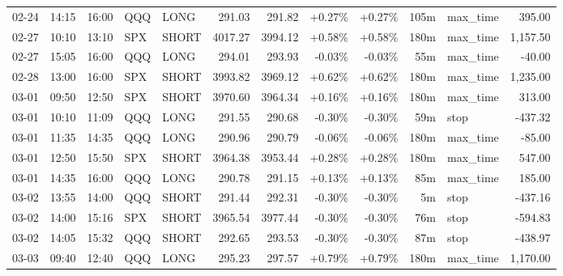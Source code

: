 \documentclass[11pt,a4paper,twoside]{article}
\begin{document}
\begin{center}
\begin{longtable}{>{\color{txtmain}}l l l l l r r r r r >{\color{txtmain}}l r}
02-24 & 14:15 & 16:00 & QQQ & LONG & 291.03 & 291.82 & \textcolor{wingreen}{+0.27\%} & \textcolor{wingreen}{+0.27\%} & 105m & max\_time & \textcolor{wingreen}{395.00} \\
02-27 & 10:10 & 13:10 & SPX & SHORT & 4017.27 & 3994.12 & \textcolor{wingreen}{+0.58\%} & \textcolor{wingreen}{+0.58\%} & 180m & max\_time & \textcolor{wingreen}{1,157.50} \\
02-27 & 15:05 & 16:00 & QQQ & LONG & 294.01 & 293.93 & \textcolor{lossred}{-0.03\%} & \textcolor{lossred}{-0.03\%} & 55m & max\_time & \textcolor{lossred}{-40.00} \\
02-28 & 13:00 & 16:00 & SPX & SHORT & 3993.82 & 3969.12 & \textcolor{wingreen}{+0.62\%} & \textcolor{wingreen}{+0.62\%} & 180m & max\_time & \textcolor{wingreen}{1,235.00} \\
03-01 & 09:50 & 12:50 & SPX & SHORT & 3970.60 & 3964.34 & \textcolor{wingreen}{+0.16\%} & \textcolor{wingreen}{+0.16\%} & 180m & max\_time & \textcolor{wingreen}{313.00} \\
03-01 & 10:10 & 11:09 & QQQ & LONG & 291.55 & 290.68 & \textcolor{lossred}{-0.30\%} & \textcolor{lossred}{-0.30\%} & 59m & stop & \textcolor{lossred}{-437.32} \\
03-01 & 11:35 & 14:35 & QQQ & LONG & 290.96 & 290.79 & \textcolor{lossred}{-0.06\%} & \textcolor{lossred}{-0.06\%} & 180m & max\_time & \textcolor{lossred}{-85.00} \\
03-01 & 12:50 & 15:50 & SPX & SHORT & 3964.38 & 3953.44 & \textcolor{wingreen}{+0.28\%} & \textcolor{wingreen}{+0.28\%} & 180m & max\_time & \textcolor{wingreen}{547.00} \\
03-01 & 14:35 & 16:00 & QQQ & LONG & 290.78 & 291.15 & \textcolor{wingreen}{+0.13\%} & \textcolor{wingreen}{+0.13\%} & 85m & max\_time & \textcolor{wingreen}{185.00} \\
03-02 & 13:55 & 14:00 & QQQ & SHORT & 291.44 & 292.31 & \textcolor{lossred}{-0.30\%} & \textcolor{lossred}{-0.30\%} & 5m & stop & \textcolor{lossred}{-437.16} \\
03-02 & 14:00 & 15:16 & SPX & SHORT & 3965.54 & 3977.44 & \textcolor{lossred}{-0.30\%} & \textcolor{lossred}{-0.30\%} & 76m & stop & \textcolor{lossred}{-594.83} \\
03-02 & 14:05 & 15:32 & QQQ & SHORT & 292.65 & 293.53 & \textcolor{lossred}{-0.30\%} & \textcolor{lossred}{-0.30\%} & 87m & stop & \textcolor{lossred}{-438.97} \\
03-03 & 09:40 & 12:40 & QQQ & LONG & 295.23 & 297.57 & \textcolor{wingreen}{+0.79\%} & \textcolor{wingreen}{+0.79\%} & 180m & max\_time & \textcolor{wingreen}{1,170.00} \\

\end{longtable}
\end{center}
\end{document}
